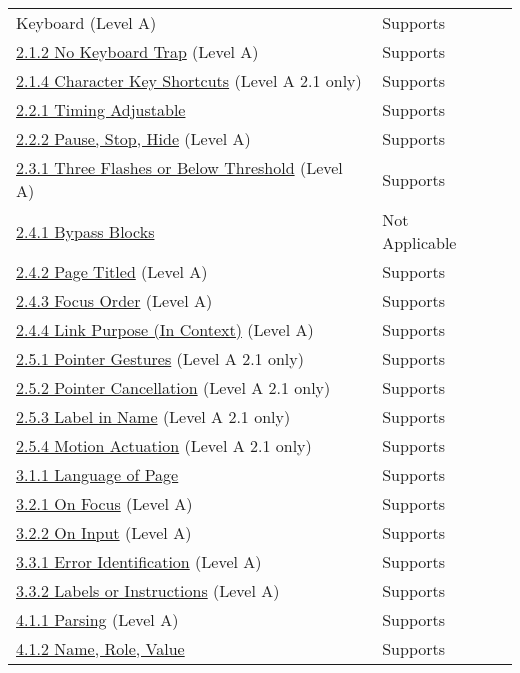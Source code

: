 \documentclass[a4paper]{report}
\begin{document}
\begin{longtable}{p{}<{\RaggedRight}p{}<{\RaggedRight}p{}<{\RaggedRight}}
{  Keyboard} (Level A) & Supports \\
  \href{http://www.w3.org/TR/WCAG20/#keyboard-operation-trapping}{2.1.2
  No Keyboard Trap} (Level A) & Supports \\
  \href{https://www.w3.org/TR/WCAG21/#character-key-shortcuts}{2.1.4
  Character Key Shortcuts} (Level A 2.1 only) & Supports \\
        \href{http://www.w3.org/TR/WCAG20/#time-limits-required-behaviors}{2.2.1
  Timing Adjustable} & Supports\\
  \href{http://www.w3.org/TR/WCAG20/#time-limits-pause}{2.2.2 Pause, Stop,
  Hide} (Level A) & Supports\\
  \href{http://www.w3.org/TR/WCAG20/#seizure-does-not-violate}{2.3.1
  Three Flashes or Below Threshold} (Level A) & Supports\\
  \href{http://www.w3.org/TR/WCAG20/#navigation-mechanisms-skip}{2.4.1
  Bypass Blocks} & Not Applicable\\
  \href{http://www.w3.org/TR/WCAG20/#navigation-mechanisms-title}{2.4.2 Page Titled} (Level A) & Supports\\
  \href{http://www.w3.org/TR/WCAG20/#navigation-mechanisms-focus-order}{2.4.3 Focus Order} (Level A) & Supports\\
  \href{http://www.w3.org/TR/WCAG20/#navigation-mechanisms-refs}{2.4.4 Link Purpose (In Context)} (Level A) & Supports\\
  \href{https://www.w3.org/TR/WCAG21/#pointer-gestures}{2.5.1 Pointer Gestures} (Level A 2.1 only) & Supports\\
  \href{https://www.w3.org/TR/WCAG21/#pointer-cancellation}{2.5.2
  Pointer Cancellation} (Level A 2.1 only) &  Supports\\
  \href{https://www.w3.org/TR/WCAG21/#label-in-name}{2.5.3 Label in Name} (Level A 2.1 only) & Supports\\
  \href{https://www.w3.org/TR/WCAG21/#motion-actuation}{2.5.4 Motion Actuation} (Level A 2.1 only) & Supports\\
  \href{http://www.w3.org/TR/WCAG20/#meaning-doc-lang-id}{3.1.1 Language of Page} & Supports\\
  \href{http://www.w3.org/TR/WCAG20/#consistent-behavior-receive-focus}{3.2.1 On Focus} (Level A) & Supports\\
  \href{http://www.w3.org/TR/WCAG20/#consistent-behavior-unpredictable-change}{3.2.2 On Input} (Level A) & Supports\\
  \href{http://www.w3.org/TR/WCAG20/#minimize-error-identified}{3.3.1 Error Identification} (Level A) & Supports\\
        \href{http://www.w3.org/TR/WCAG20/#minimize-error-cues}{3.3.2 Labels or Instructions} (Level A) & Supports\\
  \href{http://www.w3.org/TR/WCAG20/#ensure-compat-parses}{4.1.1 Parsing} (Level A) & Supports\\
  \href{http://www.w3.org/TR/WCAG20/#ensure-compat-rsv}{4.1.2 Name, Role, Value} & Supports\\
\end{longtable}
\end{document}
